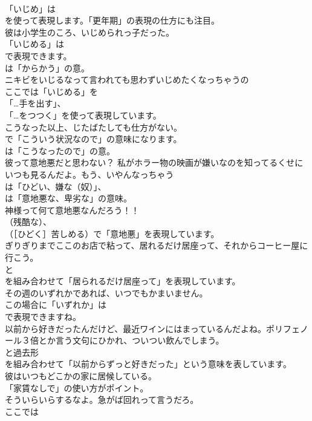 \documentclass[8pt]{extreport}
\begin{document}
\begin{CJK}{UTF8}{min}
\\	「いじめ」は
\\	を使って表現します。「更年期」の表現の仕方にも注目。	
\\	彼は小学生のころ、いじめられっ子だった。 
\\	「いじめる」は 
\\	で表現できます。
\\	は「からかう」の意。	
\\	ニキビをいじるなって言われても思わずいじめたくなっちゃうの 
\\	ここでは「いじめる」を
\\	「…手を出す」、
\\	「…をつつく」を使って表現しています。	
\\	こうなった以上、じたばたしても仕方がない。 
\\	で「こういう状況なので」の意味になります。
\\	は「こうなったので」の意。	
\\	彼って意地悪だと思わない？ 私がホラー物の映画が嫌いなのを知ってるくせにいつも見るんだよ。もう、いやんなっちゃう 
\\	は「ひどい、嫌な（奴）」、
\\	は「意地悪な、卑劣な」の意味。	
\\	神様って何て意地悪なんだろう！！ 
\\	（残酷な）、
\\	（［ひどく］苦しめる）で「意地悪」を表現しています。	
\\	ぎりぎりまでここのお店で粘って、居れるだけ居座って、それからコーヒー屋に行こう。 
\\	と 
\\	を組み合わせて「居られるだけ居座って」を表現しています。	
\\	その週のいずれかであれば、いつでもかまいません。 
\\	この場合に「いずれか」は
\\	で表現できますね。	
\\	以前から好きだったんだけど、最近ワインにはまっているんだよね。ポリフェノール３倍とか言う文句にひかれ、ついつい飲んでしまう。 
\\	と過去形
\\	を組み合わせて「以前からずっと好きだった」という意味を表しています。	
\\	彼はいつもどこかの家に居候している。 
\\	「家賃なしで」の使い方がポイント。	
\\	そういらいらするなよ。急がば回れって言うだろ。 
\\	ここでは

\end{CJK}
\end{document}
